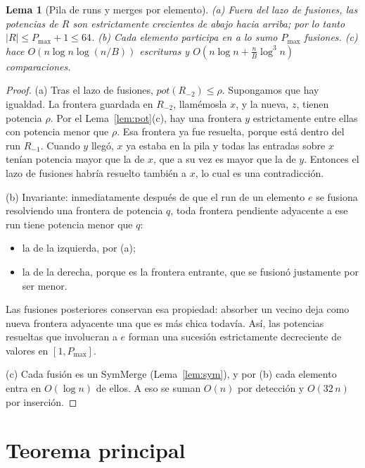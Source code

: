 \documentclass[10pt,a4paper]{article}
\theoremstyle{plain}
\newtheorem{lema}[teorema]{Lema}
\theoremstyle{definition}
\theoremstyle{remark}
\newcommand{\Bsz}{B}
\begin{document}
\begin{lema}[Pila de runs y merges por elemento]\label{lem:natcost}
(a) Fuera del lazo de fusiones, las potencias de $R$ son estrictamente crecientes de
abajo hacia arriba; por lo tanto $|R|\le P_{\max}+1\le 64$.
(b) Cada elemento participa en a lo sumo $P_{\max}$ fusiones.
(c) \Natural hace $O(n\log n\log(n/\Bsz))$ escrituras y
$O(n\log n+\frac{n}{\Bsz}\log^3 n)$ comparaciones.
\end{lema}
\begin{proof}
(a) Tras el lazo de fusiones, $\mathit{pot}(R_{-2})\le\rho$. Supongamos que hay
igualdad. La frontera guardada en $R_{-2}$, llamémosla $x$, y la nueva, $z$, tienen
potencia $\rho$. Por el Lema~\ref{lem:pot}(c), hay una frontera $y$ estrictamente
entre ellas con potencia menor que $\rho$. Esa frontera ya fue resuelta, porque está
dentro del run $R_{-1}$. Cuando $y$ llegó, $x$ ya estaba en la pila y todas las
entradas sobre $x$ tenían potencia mayor que la de $x$, que a su vez es mayor que la
de $y$. Entonces el lazo de fusiones habría resuelto también a $x$, lo cual es una
contradicción.

(b) Invariante: inmediatamente después de que el run de un elemento $e$ se fusiona
resolviendo una frontera de potencia $q$, toda frontera pendiente adyacente a ese run
tiene potencia menor que $q$:
\begin{itemize}[nosep]
\item la de la izquierda, por (a);
\item la de la derecha, porque es la frontera entrante, que se fusionó justamente por
  ser menor.
\end{itemize}
Las fusiones posteriores conservan esa propiedad: absorber un vecino deja como nueva
frontera adyacente una que es más chica todavía. Así, las potencias resueltas que
involucran a $e$ forman una sucesión estrictamente decreciente de valores en
$[1,P_{\max}]$.

(c) Cada fusión es un SymMerge (Lema~\ref{lem:sym}), y por (b) cada elemento entra en
$O(\log n)$ de ellos. A eso se suman $O(n)$ por detección y $O(32\,n)$ por inserción.
\end{proof}

\section{Teorema principal}
\end{document}
